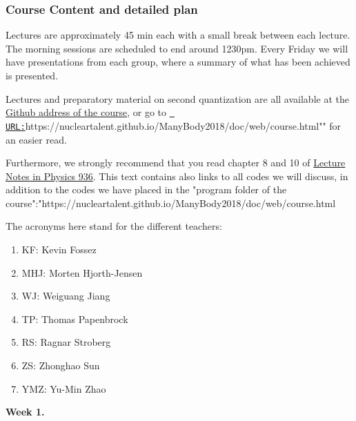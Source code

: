 \documentclass{beamer}
\begin{document}
\begin{frame}
\frametitle{Course Content and detailed plan}

\begin{block}{}

Lectures are approximately 45 min each with a small break between each lecture. The morning sessions are scheduled to end around 1230pm. 
Every Friday we will have presentations from each group, where a summary of what has been achieved is presented. 

Lectures and preparatory material on second quantization are all available at the \href{{https://github.com/NuclearTalent/ManyBody2018}}{Github address of the course}, or go to \href{{URL:}}{\nolinkurl{ URL:}}https://nucleartalent.github.io/ManyBody2018/doc/web/course.html""  for an easier read. 

Furthermore, we strongly recommend that you read chapter 8 and 10 of \href{{https://www.springer.com/us/book/9783319533353}}{Lecture Notes in Physics 936}. This text contains also links to all codes we will discuss, in addition to the codes we have placed in the "program folder of the course":"https://nucleartalent.github.io/ManyBody2018/doc/web/course.html

The acronyms here stand for the different teachers:
\begin{enumerate}
\item KF: Kevin Fossez

\item MHJ: Morten Hjorth-Jensen

\item WJ: Weiguang Jiang

\item TP: Thomas Papenbrock

\item RS: Ragnar Stroberg

\item ZS: Zhonghao Sun

\item YMZ: Yu-Min Zhao
\end{enumerate}

\noindent
\noindent\textbf{Week 1.}


\end{block}
\end{frame}
\end{document}
